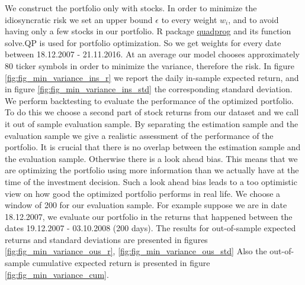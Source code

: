 \documentclass[letterpaper,12pt]{article}
\begin{document}
We construct the portfolio only with stocks. In order to minimize the idiosyncratic risk we set an upper bound $\epsilon$ to every weight $w_i$, and to avoid having only a few stocks in our portfolio.\newline
R package \href{https://cran.r-project.org/web/packages/quadprog/quadprog.pdf}{quadprog} and its function solve.QP is used for portfolio optimization. So we get weights for every date between 18.12.2007 - 21.11.2016. At an average our model chooses approximately 80 ticker symbols in order to minimize the variance, therefore the risk. In figure \ref{fig:fig_min_variance_ins_r} we report the daily in-sample expected return, and in figure \ref{fig:fig_min_variance_ins_std} the corresponding standard deviation. We perform backtesting to evaluate the performance of the optimized portfolio. To do this we choose a second part of stock returns from our dataset and we call it out of sample evaluation sample. By separating the estimation sample and the evaluation sample we give a realistic assessment of the performance of the portfolio. It is crucial that there is no overlap between the estimation sample and the evaluation sample. Otherwise there is a look ahead bias. This means that we are optimizing the portfolio using more information than we actually have at the time of the investment decision. Such a look ahead bias leads to a too optimistic view on how good the optimized portfolio performs in real life. We choose a window of 200 for our evaluation sample. For example suppose we are in date 18.12.2007, we evaluate our portfolio in the returns that happened between the dates 19.12.2007 - 03.10.2008 (200 days). The results for out-of-sample expected returns and standard deviations are presented in figures \ref{fig:fig_min_variance_ous_r}, \ref{fig:fig_min_variance_ous_std} Also the out-of-sample cumulative expected return is presented in figure \ref{fig:fig_min_variance_cum}.
\end{document}
